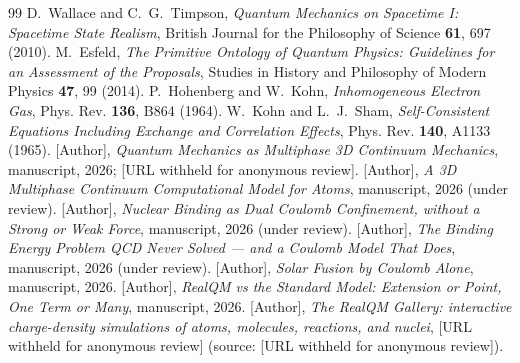 \documentclass[11pt]{article}
\begin{document}
\begin{thebibliography}{99}
 D.~Wallace and C.~G.~Timpson, \emph{Quantum Mechanics on Spacetime I:
Spacetime State Realism}, British Journal for the Philosophy of Science \textbf{61}, 697 (2010).
 M.~Esfeld, \emph{The Primitive Ontology of Quantum Physics: Guidelines for an
Assessment of the Proposals}, Studies in History and Philosophy of Modern Physics \textbf{47}, 99 (2014).
 P.~Hohenberg and W.~Kohn, \emph{Inhomogeneous Electron Gas}, Phys. Rev.
\textbf{136}, B864 (1964).
 W.~Kohn and L.~J.~Sham, \emph{Self-Consistent Equations Including Exchange and
Correlation Effects}, Phys. Rev. \textbf{140}, A1133 (1965).
 [Author], \emph{Quantum Mechanics as Multiphase 3D Continuum Mechanics}, manuscript,
2026; [URL withheld for anonymous review].
 [Author], \emph{A 3D Multiphase Continuum Computational Model for Atoms},
manuscript, 2026 (under review).
 [Author], \emph{Nuclear Binding as Dual Coulomb Confinement, without a Strong or
Weak Force}, manuscript, 2026 (under review).
 [Author], \emph{The Binding Energy Problem QCD Never Solved --- and a Coulomb Model
That Does}, manuscript, 2026 (under review).
 [Author], \emph{Solar Fusion by Coulomb Alone}, manuscript, 2026.
 [Author], \emph{RealQM vs the Standard Model: Extension or Point, One Term or Many},
manuscript, 2026.
 [Author], \emph{The RealQM Gallery: interactive charge-density simulations of
atoms, molecules, reactions, and nuclei}, [URL withheld for anonymous review]
(source: [URL withheld for anonymous review]).
\end{thebibliography}
\end{document}
